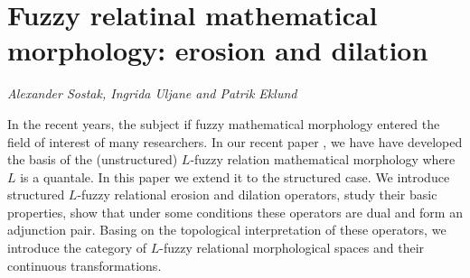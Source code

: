 \documentclass[../booklet.tex]{subfiles}
\begin{document}
\section[Fuzzy relatinal mathematical morphology: erosion and dilation. {\it Alexander Sostak, Ingrida Uljane and Patrik Eklund}]{Fuzzy relatinal mathematical morphology: erosion and dilation}
  

\begin{center}
  {\it Alexander Sostak, Ingrida Uljane and Patrik Eklund}
\end{center}

\vskip 0.8cm

 In the recent years, the subject if fuzzy mathematical morphology entered the field of interest of many researchers. In our recent paper \cite{SoUl1}, we have have developed the basis of the (unstructured) $L$-fuzzy relation mathematical morphology where $L$ is a quantale. In this paper we extend  it to the structured case. We introduce structured $L$-fuzzy relational erosion and dilation operators, study their basic properties, show that under some conditions  these operators are dual and form an adjunction pair. Basing on the topological interpretation of these operators, we introduce the category of  $L$-fuzzy relational morphological spaces and their continuous transformations. 


\end{document}
